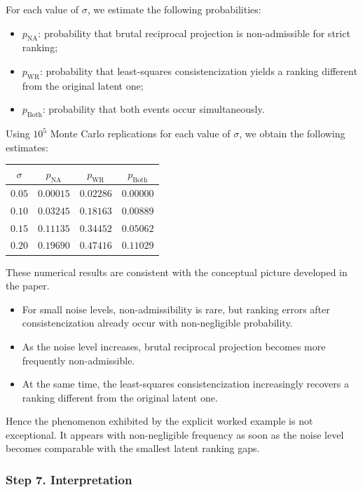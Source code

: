 \documentclass[11pt]{amsart}
\theoremstyle{definition}
\theoremstyle{plain}
\numberwithin{equation}{section}
\begin{document}
For each value of $\sigma$, we estimate the following probabilities:
\begin{itemize}
\item $p_{\mathrm{NA}}$: probability that brutal reciprocal projection is non-admissible for strict ranking;
\item $p_{\mathrm{WR}}$: probability that least-squares consistencization yields a ranking different from the original latent one;
\item $p_{\mathrm{Both}}$: probability that both events occur simultaneously.
\end{itemize}

Using $10^5$ Monte Carlo replications for each value of $\sigma$, we obtain the following estimates:

\begin{center}
\begin{tabular}{c|ccc}
\hline
$\sigma$ & $p_{\mathrm{NA}}$ & $p_{\mathrm{WR}}$ & $p_{\mathrm{Both}}$\\
\hline
$0.05$ & $0.00015$ & $0.02286$ & $0.00000$\\
$0.10$ & $0.03245$ & $0.18163$ & $0.00889$\\
$0.15$ & $0.11135$ & $0.34452$ & $0.05062$\\
$0.20$ & $0.19690$ & $0.47416$ & $0.11029$\\
\hline
\end{tabular}
\end{center}

These numerical results are consistent with the conceptual picture developed in the paper.

\begin{itemize}
\item For small noise levels, non-admissibility is rare, but ranking errors after consistencization already occur with non-negligible probability.
\item As the noise level increases, brutal reciprocal projection becomes more frequently non-admissible.
\item At the same time, the least-squares consistencization increasingly recovers a ranking different from the original latent one.
\end{itemize}

Hence the phenomenon exhibited by the explicit worked example is not exceptional. It appears with non-negligible frequency as soon as the noise level becomes comparable with the smallest latent ranking gaps.

\subsubsection*{Step 7. Interpretation}
\end{document}
